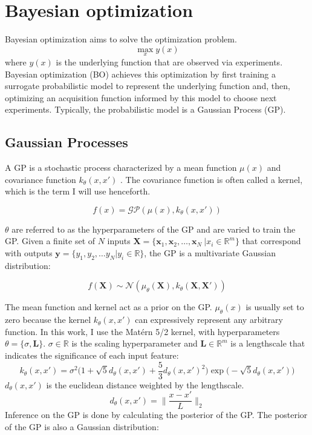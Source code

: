 \section{Bayesian optimization}

Bayesian optimization aims to solve the optimization problem.
\begin{equation}
    \max_x y(x)
\end{equation}
where $y(x)$ is the underlying function that are observed via experiments. Bayesian optimization (BO) achieves this optimization by first training a surrogate probabilistic model to represent the underlying function and, then, optimizing an acquisition function informed by this model to choose next experiments. Typically,  the probabilistic model is a Gaussian Process (GP). 

\subsection{Gaussian Processes}

A GP is a stochastic process characterized by a mean function $\mu(x)$ and covariance function $k_{\theta}(x,x')$ \cite{Rasmussen2006}. The covariance function is often called a kernel, which is the term I will use henceforth.

\begin{equation}
    f(x)= \mathcal{GP}(\mu(x), k_{\theta}(x, x'))
\end{equation}

$\theta$ are referred to as the hyperparameters of the GP and are varied to train the GP. Given a finite set of $N$ inputs $\mathbf X = \{\mathbf x_1, \mathbf x_2, \dots, \mathbf x_N \ \vert x_i \in \mathbb R^m \}$ that correspond with outputs $\mathbf y = \{y_1, y_2, \dots y_N \vert  y_i \in \mathbb R \}$, the GP is a multivariate Gaussian distribution:

\begin{equation}
    f(\mathbf X) \sim \mathcal N(\mu_{\theta}(\mathbf X), k_{\theta}(\mathbf X, \mathbf X'))
\end{equation}

The mean function and kernel act as a prior on the GP.  $\mu_{\theta}(x)$ is usually set to zero because the kernel  $k_{\theta}(x, x')$ can expressively represent any arbitrary function. In this work, I use the Matérn 5/2 kernel, with hyperparameters $\theta=\{\sigma,\mathbf L \}$. $\sigma \in \mathbb R$ is the scaling hyperparameter and $\mathbf L \in \mathbb R^m$ is a lengthscale that indicates the significance of each input feature:
\begin{equation}
    k_{\theta}(x, x') = \sigma^2 \biggl(1 + \sqrt{5}d_{\theta}(x,x')+\frac{5}{3}d_{\theta}(x,x')^2\biggr)\exp\biggl(-\sqrt{5}d_{\theta}(x,x') \biggr)
\end{equation}
$d_{\theta}(x,x')$ is the euclidean distance weighted by the lengthscale.
\begin{equation}
    d_{\theta}(x,x')=\biggl\lVert \frac{x-x'}{L} \biggr\rVert_2
\end{equation}
Inference on the GP is done by calculating the posterior of the GP. The posterior of the GP is also a Gaussian distribution:

